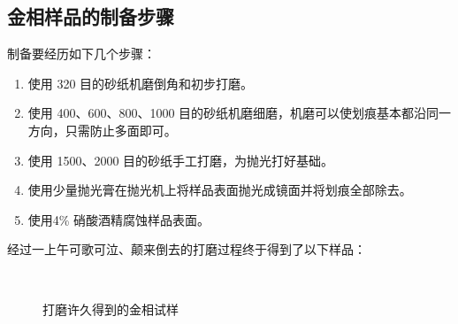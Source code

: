\documentclass[a4paper,utf8]{article}
\begin{document}
    \subsection{金相样品的制备步骤}
        制备要经历如下几个步骤：\par
        \begin{enumerate}
            \item 使用 320 目的砂纸机磨倒角和初步打磨。
            \item 使用 400、600、800、1000 目的砂纸机磨细磨，机磨可以使划痕基本都沿同一方向，只需防止多面即可。
            \item 使用 1500、2000 目的砂纸手工打磨，为抛光打好基础。
            \item 使用少量抛光膏在抛光机上将样品表面抛光成镜面并将划痕全部除去。
            \item 使用4\% 硝酸酒精腐蚀样品表面。
        \end{enumerate}\par
        经过一上午可歌可泣、颠来倒去的打磨过程终于得到了以下样品：
        \begin{figure}[!ht]
            \caption{打磨许久得到的金相试样\label{fig:1}}
            \hspace{5mm}
             \\
        \end{figure}
\end{document}
